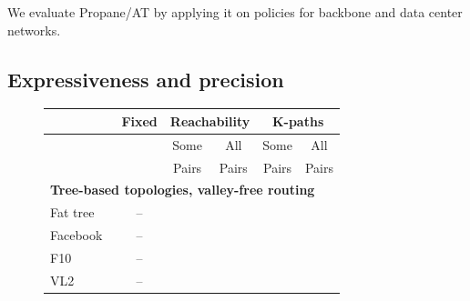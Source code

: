 \documentclass[numbers, 10pt]{sigplanconf}
\newcommand{\sysname}{{\text{}\small \sf Propane/AT}\xspace}
\newcommand{\cmark}{\ding{51}}
\begin{document}
We evaluate \sysname by applying it on policies for backbone and data center networks. 

\subsection{Expressiveness and precision}

\begin{figure}[t!]
  \begin{center}
      \begin{tabular}{| l | c| c | c | c | c | }
      \hline
       & \textbf{Fixed} & \multicolumn{2}{|c|}{\textbf{Reachability}} & \multicolumn{2}{|c|}{\textbf{K-paths}} \\ \hline
       & & Some & All & Some & All \\
       & & Pairs & Pairs & Pairs & Pairs \\ \hline

      \multicolumn{6}{l}{\textbf{Tree-based topologies, valley-free routing}} \\ \hline

      Fat tree~\cite{fattree} & -- & \cmark & \cmark & \cmark & \cmark  \\ \hline
      Facebook~\cite{facebook-fattree} & -- & \cmark & \cmark & \cmark & \cmark \\ \hline
      F10~\cite{f10-fattree} & -- & \cmark & \cmark & \cmark & \cmark \\ \hline
      VL2~\cite{vl2-fattree} & -- & \cmark & \cmark & \cmark & \cmark \\ \hline
%


\end{tabular}
\end{center}
\end{figure}
\end{document}
